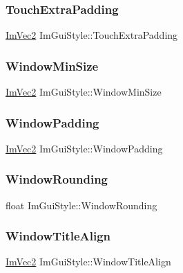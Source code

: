 \subsubsection{\texorpdfstring{Touch\+Extra\+Padding}{TouchExtraPadding}}
{\footnotesize\ttfamily \hyperlink{struct_im_vec2}{Im\+Vec2} Im\+Gui\+Style\+::\+Touch\+Extra\+Padding}

\hypertarget{struct_im_gui_style_a060b2f743a086d0f0fee4cd5b3f372d4}{}\label{struct_im_gui_style_a060b2f743a086d0f0fee4cd5b3f372d4} 
\subsubsection{\texorpdfstring{Window\+Min\+Size}{WindowMinSize}}
{\footnotesize\ttfamily \hyperlink{struct_im_vec2}{Im\+Vec2} Im\+Gui\+Style\+::\+Window\+Min\+Size}

\hypertarget{struct_im_gui_style_a37f156b53e6dcc99ff57366ceafe8b50}{}\label{struct_im_gui_style_a37f156b53e6dcc99ff57366ceafe8b50} 
\subsubsection{\texorpdfstring{Window\+Padding}{WindowPadding}}
{\footnotesize\ttfamily \hyperlink{struct_im_vec2}{Im\+Vec2} Im\+Gui\+Style\+::\+Window\+Padding}

\hypertarget{struct_im_gui_style_acd902c2ab4b53d4bb0f64da608320894}{}\label{struct_im_gui_style_acd902c2ab4b53d4bb0f64da608320894} 
\subsubsection{\texorpdfstring{Window\+Rounding}{WindowRounding}}
{\footnotesize\ttfamily float Im\+Gui\+Style\+::\+Window\+Rounding}

\hypertarget{struct_im_gui_style_a3fc57a15ab8f206045f1e5dfccd8b2e7}{}\label{struct_im_gui_style_a3fc57a15ab8f206045f1e5dfccd8b2e7} 
\subsubsection{\texorpdfstring{Window\+Title\+Align}{WindowTitleAlign}}
{\footnotesize\ttfamily \hyperlink{struct_im_vec2}{Im\+Vec2} Im\+Gui\+Style\+::\+Window\+Title\+Align}

